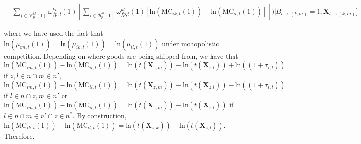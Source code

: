 \begin{linenomath*}
\begin{equation*}
\begin{aligned}
                                - \sum_{f \in \mathcal{F}^{kl}_{p}(1)}\omega^{kl}_{fp,t}(1)
                                    \left[
                                        \sum_{i \in \mathcal{B}^{kl}_{p}(1)} \omega^{kl}_{fp,t}(1)
                                        \left[\text{ln}\left(\text{MC}_{ik,t}(1)\right) - \text{ln}\left(\text{MC}_{il,t}(1)\right)
                                        \right]
                                    \right] 
                        \Bigg)
                        \Bigg|  B_{l \rightarrow (k,m)} = 1, \boldsymbol{X}_{l \rightarrow (k,m)}
                    \Bigg]
        \end{aligned}
    \end{equation*}
\end{linenomath*}
where we have used the fact that $\text{ln}\left(\mu_{im,t}(1)\right) = \text{ln}\left(\mu_{ik,t}(1)\right) = \text{ln}\left(\mu_{il,t}(1)\right)$ under monopolistic competition.
Depending on where goods are being shipped from, we have that $\text{ln}\left(\text{MC}_{im,t}(1)\right) - \text{ln}\left(\text{MC}_{il,t}(1)\right) = \text{ln}\left(t(\boldsymbol{X}_{z,m})\right) - \text{ln}\left(t(\boldsymbol{X}_{z,l})\right) + \text{ln}\left(\left(1+\tau_{i,t}\right)\right)$ if $z,l \in n \cap m \in n'$, $\text{ln}\left(\text{MC}_{im,t}(1)\right) - \text{ln}\left(\text{MC}_{il,t}(1)\right) = \text{ln}\left(t(\boldsymbol{X}_{z,m})\right) - \text{ln}\left(t(\boldsymbol{X}_{z,l})\right) - \text{ln}\left(\left(1+\tau_{i,t}\right)\right)$ if $l \in n \cap z,m \in n'$ or $\text{ln}\left(\text{MC}_{im,t}(1)\right) - \text{ln}\left(\text{MC}_{il,t}(1)\right) = \text{ln}\left(t(\boldsymbol{X}_{z,m})\right) - \text{ln}\left(t(\boldsymbol{X}_{z,l})\right)$ if $l \in n \cap m \in n' \cap z \in n^{''}$. By construction, $\text{ln}\left(\text{MC}_{ik,t}(1)\right) - \text{ln}\left(\text{MC}_{il,t}(1)\right) = \text{ln}\left(t(\boldsymbol{X}_{z,k})\right) - \text{ln}\left(t(\boldsymbol{X}_{z,l})\right)$. Therefore,
